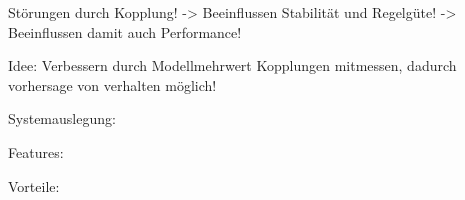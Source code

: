 \documentclass[fleqn,11pt,aspectratio=43]{beamer}
\begin{document}
\begin{frame}
Störungen durch Kopplung!
-> Beeinflussen Stabilität und Regelgüte!
-> Beeinflussen damit auch Performance!
\end{frame}

\begin{frame}
Idee: Verbessern durch Modellmehrwert
Kopplungen mitmessen, dadurch vorhersage von verhalten möglich!
\end{frame}

\begin{frame}
Systemauslegung:

Features:

Vorteile:

\end{frame}
\end{document}
